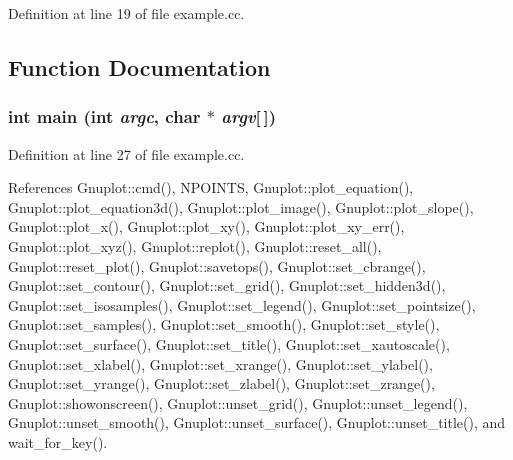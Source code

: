 Definition at line 19 of file example.cc.

\subsection{Function Documentation}
\subsubsection[{main}]{\setlength{\rightskip}{0pt plus 5cm}int main (int {\em argc}, \/  char $\ast$ {\em argv}[$\,$])}\label{d2/d80/example_8cc_0ddf1224851353fc92bfbff6f499fa97}




Definition at line 27 of file example.cc.

References Gnuplot::cmd(), NPOINTS, Gnuplot::plot\_\-equation(), Gnuplot::plot\_\-equation3d(), Gnuplot::plot\_\-image(), Gnuplot::plot\_\-slope(), Gnuplot::plot\_\-x(), Gnuplot::plot\_\-xy(), Gnuplot::plot\_\-xy\_\-err(), Gnuplot::plot\_\-xyz(), Gnuplot::replot(), Gnuplot::reset\_\-all(), Gnuplot::reset\_\-plot(), Gnuplot::savetops(), Gnuplot::set\_\-cbrange(), Gnuplot::set\_\-contour(), Gnuplot::set\_\-grid(), Gnuplot::set\_\-hidden3d(), Gnuplot::set\_\-isosamples(), Gnuplot::set\_\-legend(), Gnuplot::set\_\-pointsize(), Gnuplot::set\_\-samples(), Gnuplot::set\_\-smooth(), Gnuplot::set\_\-style(), Gnuplot::set\_\-surface(), Gnuplot::set\_\-title(), Gnuplot::set\_\-xautoscale(), Gnuplot::set\_\-xlabel(), Gnuplot::set\_\-xrange(), Gnuplot::set\_\-ylabel(), Gnuplot::set\_\-yrange(), Gnuplot::set\_\-zlabel(), Gnuplot::set\_\-zrange(), Gnuplot::showonscreen(), Gnuplot::unset\_\-grid(), Gnuplot::unset\_\-legend(), Gnuplot::unset\_\-smooth(), Gnuplot::unset\_\-surface(), Gnuplot::unset\_\-title(), and wait\_\-for\_\-key().

